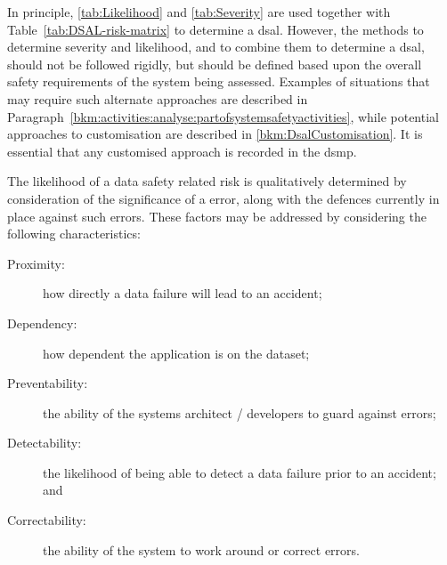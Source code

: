 In principle, \autoref {tab:Likelihood} and \autoref{tab:Severity} are used together with Table~\ref{tab:DSAL-risk-matrix} to determine a \gls{dsal}. However, the methods to determine severity and likelihood, and to combine them to determine a \gls{dsal}, should not be followed rigidly, but should be defined based upon the overall safety requirements of the system being assessed. Examples of situations that may require such alternate approaches are described in
Paragraph~\ref{bkm:activities:analyse:partofsystemsafetyactivities},
while potential approaches to customisation are described in \autoref{bkm:DsalCustomisation}.
It is essential that any customised approach is recorded in the \gls{dsmp}.

The likelihood of a data safety related risk is qualitatively determined by
consideration of the significance of a \gls{error}, along with the defences currently in place against such errors. These factors may be addressed by
considering the following characteristics:

\begin{description}
	\item[Proximity:] how directly a data failure will lead to an accident;
	\item[Dependency:] how dependent the application is on the \gls{dataset};
	\item[Preventability:] the ability of the systems architect / developers to guard against \glspl{error};
	\item[Detectability:] the likelihood of being able to detect a data failure prior to an accident; and
	\item[Correctability:] the ability of the system to work around or correct \glspl{error}.
\end{description}

